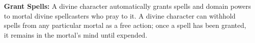 




\textbf{Grant Spells:} A divine character automatically grants spells and domain powers to mortal divine spellcasters who pray to it. A divine character can withhold spells from any particular mortal as a free action; once a spell has been granted, it remains in the mortal's mind until expended.